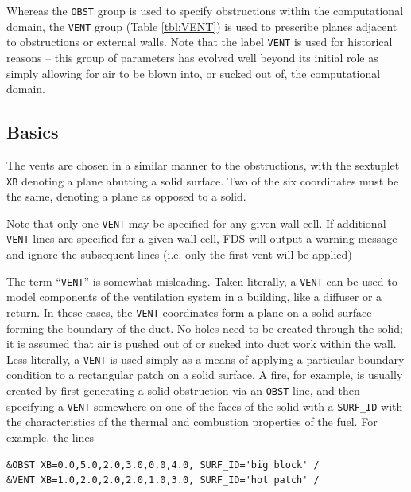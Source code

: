 \documentclass[11pt]{book}
\newcommand{\ct}{\tt\small}
\begin{document}
Whereas the {\ct OBST} group is used to specify obstructions within the
computational domain, the {\ct VENT} group (Table \ref{tbl:VENT}) is used to prescribe planes
adjacent to obstructions or external walls. Note that the label {\ct VENT} is used for historical reasons -- this group of parameters has
evolved well beyond its initial role as simply allowing for air to be blown into, or sucked out of, the computational domain.

\subsection{Basics}

\label{info:VENT_Basics}

The vents are chosen in a
similar manner to the obstructions, with the sextuplet {\ct XB}
denoting a plane abutting a solid surface. Two of the six coordinates must
be the same, denoting a plane as opposed to a solid.

\begin{warning}
\noindent
Note that only one {\ct VENT} may be specified for any given wall cell.  If additional {\ct VENT} lines are specified for a
given wall cell, FDS will output a warning message and ignore the subsequent lines (i.e. only the first vent
will be applied)
\end{warning}

\noindent The term ``{\ct VENT}'' is somewhat misleading. Taken literally, a
{\ct VENT} can be used to model components of the ventilation system in
a building, like a diffuser or a return.
In these cases, the {\ct VENT} coordinates form a plane on a
solid surface forming the boundary of the duct.
No holes need to be created through the solid; it is
assumed that air is pushed out of or sucked into duct work within the
wall. Less literally, a {\ct VENT} is used simply as a means of applying
a particular boundary condition to a rectangular patch on a solid surface.
A fire, for example, is usually created by first generating a solid
obstruction via an {\ct OBST} line, and then specifying a {\ct VENT}
somewhere on one of the faces of the solid with a {\ct SURF\_ID}
with the characteristics of the thermal and combustion properties of the fuel.
For example, the lines

\footnotesize
\begin{verbatim}
&OBST XB=0.0,5.0,2.0,3.0,0.0,4.0, SURF_ID='big block' /
&VENT XB=1.0,2.0,2.0,2.0,1.0,3.0, SURF_ID='hot patch' /
\end{verbatim} \normalsize
\end{document}
